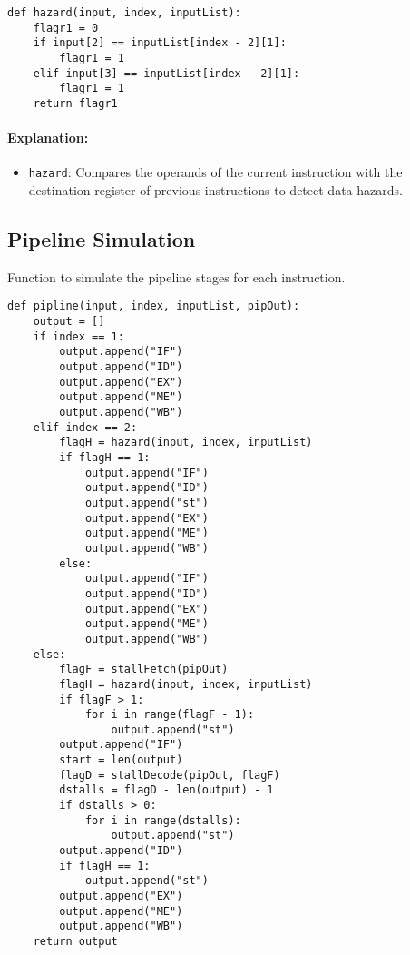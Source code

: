 \documentclass{article}
\begin{document}
\begin{lstlisting}[caption={Hazard Detection}]
def hazard(input, index, inputList):
    flagr1 = 0
    if input[2] == inputList[index - 2][1]:
        flagr1 = 1
    elif input[3] == inputList[index - 2][1]:
        flagr1 = 1
    return flagr1
\end{lstlisting}

\paragraph{Explanation:}
\begin{itemize}
    \item \texttt{hazard}: Compares the operands of the current instruction with the destination register of previous instructions to detect data hazards.
\end{itemize}

\newpage
\subsection{Pipeline Simulation}
Function to simulate the pipeline stages for each instruction.

\begin{lstlisting}[caption={Pipeline Simulation}]
def pipline(input, index, inputList, pipOut):
    output = []
    if index == 1:
        output.append("IF")
        output.append("ID")
        output.append("EX")
        output.append("ME")
        output.append("WB")
    elif index == 2:
        flagH = hazard(input, index, inputList)
        if flagH == 1:
            output.append("IF")
            output.append("ID")
            output.append("st")
            output.append("EX")
            output.append("ME")
            output.append("WB")
        else:
            output.append("IF")
            output.append("ID")
            output.append("EX")
            output.append("ME")
            output.append("WB")
    else:
        flagF = stallFetch(pipOut)
        flagH = hazard(input, index, inputList)
        if flagF > 1:
            for i in range(flagF - 1):
                output.append("st")
        output.append("IF")
        start = len(output)
        flagD = stallDecode(pipOut, flagF)
        dstalls = flagD - len(output) - 1
        if dstalls > 0:
            for i in range(dstalls):
                output.append("st")
        output.append("ID")
        if flagH == 1:
            output.append("st")
        output.append("EX")
        output.append("ME")
        output.append("WB")
    return output
\end{lstlisting}
\end{document}
